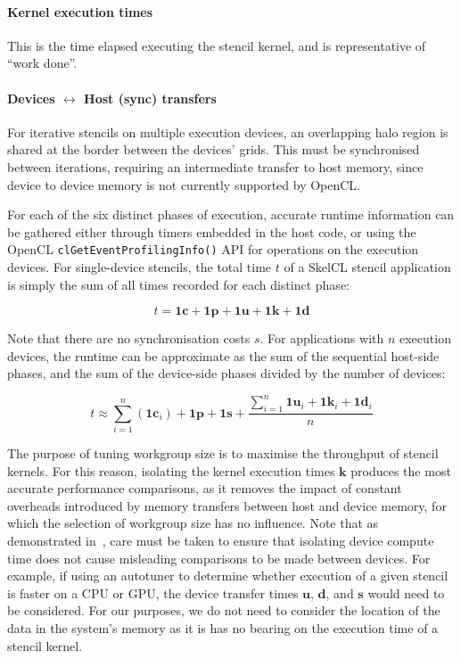 \paragraph{Kernel execution times} This is the time elapsed executing
the stencil kernel, and is representative of ``work done''.

\paragraph{Devices $\leftrightarrow$ Host (sync) transfers} For
iterative stencils on multiple execution devices, an overlapping halo
region is shared at the border between the devices' grids. This must
be synchronised between iterations, requiring an intermediate transfer
to host memory, since device to device memory is not currently
supported by OpenCL.

For each of the six distinct phases of execution, accurate runtime
information can be gathered either through timers embedded in the host
code, or using the OpenCL \texttt{clGetEventProfilingInfo()} API for
operations on the execution devices. For single-device stencils, the
total time $t$ of a SkelCL stencil application is simply the sum of
all times recorded for each distinct phase:

\begin{equation}
t = \bm{1c} + \bm{1p} + \bm{1u} + \bm{1k} + \bm{1d}
\end{equation}

Note that there are no synchronisation costs $s$. For applications
with $n$ execution devices, the runtime can be approximate as the sum
of the sequential host-side phases, and the sum of the device-side
phases divided by the number of devices:

\begin{equation}
t \approx \sum_{i=1}^n{(\bm{1c}_{i})} + \bm{1p} + \bm{1s} +
  \frac{\sum_{i=1}^n{\bm{1u}_{i} + \bm{1k}_{i} + \bm{1d}_{i}}}{n}
\end{equation}


The purpose of tuning workgroup size is to maximise the throughput of
stencil kernels. For this reason, isolating the kernel execution times
$\bm{k}$ produces the most accurate performance comparisons, as it
removes the impact of constant overheads introduced by memory
transfers between host and device memory, for which the selection of
workgroup size has no influence. Note that as demonstrated
in~\cite{Gregg2011}, care must be taken to ensure that isolating
device compute time does not cause misleading comparisons to be made
between devices. For example, if using an autotuner to determine
whether execution of a given stencil is faster on a CPU or GPU, the
device transfer times $\bm{u}$, $\bm{d}$, and $\bm{s}$ would need to
be considered. For our purposes, we do not need to consider the
location of the data in the system's memory as it is has no bearing on
the execution time of a stencil kernel.


